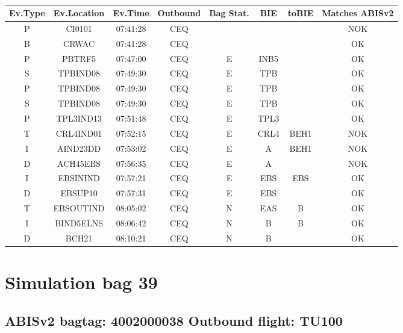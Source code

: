 \documentclass{report}
\begin{document}
\paragraph{}
\begin{longtable}{cccccccc}    \toprule
\rowcolor{white!50}
\textbf{Ev.Type} & \textbf{Ev.Location} & \textbf{Ev.Time} & \textbf{Outbound} & \textbf{Bag Stat.} & \textbf{BIE} & \textbf{toBIE} & \textbf{Matches ABISv2} \\\midrule
P & CI0101 & 07:41:28  & CEQ &  &  &  & NOK\\
B & CRWAC & 07:41:28  & CEQ &  &  &  & OK\\
P & PBTRF5 & 07:47:00  & CEQ & E & INB5 &  & OK\\
S & TPBIND08 & 07:49:30  & CEQ & E & TPB &  & OK\\
P & TPBIND08 & 07:49:30  & CEQ & E & TPB &  & OK\\
S & TPBIND08 & 07:49:30  & CEQ & E & TPB &  & OK\\
P & TPL3IND13 & 07:51:48  & CEQ & E & TPL3 &  & OK\\
T & CRL4IND01 & 07:52:15  & CEQ & E & CRL4 & BEH1 & NOK\\
I & AIND23DD & 07:53:02  & CEQ & E & A & BEH1 & NOK\\
D & ACH45EBS & 07:56:35  & CEQ & E & A &  & NOK\\
I & EBSININD & 07:57:21  & CEQ & E & EBS & EBS & OK\\
D & EBSUP10 & 07:57:31  & CEQ & E & EBS &  & OK\\
T & EBSOUTIND & 08:05:02  & CEQ & N & EAS & B & OK\\
I & BIND5ELNS & 08:06:42  & CEQ & N & B & B & OK\\
D & BCH21 & 08:10:21  & CEQ & N & B &  & OK\\
\bottomrule
\end{longtable}
\pagebreak
\section*{Simulation bag 39}
\subsection*{ABISv2 bagtag: 4002000038 Outbound flight: TU100}
\end{document}
